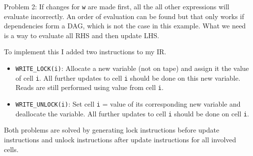 \documentclass[11pt,answers]{exam}
\begin{document}
Problem 2: If changes for \texttt{w} are made first, all the all other expressions will evaluate incorrectly. An order of evaluation can be found but that only works if dependencies form a DAG, which is not the case in this example. What we need is a way to evaluate all RHS and then update LHS.

To implement this I added two instructions to my IR.
\begin{itemize}
	\item \texttt{WRITE\_LOCK(i)}: Allocate a new variable (not on tape) and assign it the value of cell \texttt{i}. All further updates to cell \texttt{i} should be done on this new variable. Reads are still performed using value from cell \texttt{i}.
	\item \texttt{WRITE\_UNLOCK(i)}: Set cell \texttt{i} = value of its corresponding new variable and deallocate the variable. All further updates to cell \texttt{i} should be done on cell \texttt{i}.
\end{itemize}

Both problems are solved by generating lock instructions before update instructions and unlock instructions after update instructions for all involved cells.
\end{document}
